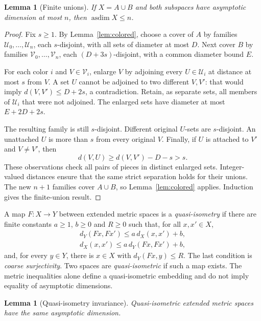 \documentclass[10pt,a4paper]{amsart}
\newtheorem{lemma}[theorem]{Lemma}
\DeclareMathOperator{\asdim}{asdim}
\newcommand{\cU}{\mathcal U}
\newcommand{\cV}{\mathcal V}
\begin{document}
\begin{lemma}[Finite unions]\label{lem:finite-union}
If $X=A\cup B$ and both subspaces have asymptotic dimension at most $n$,
then $\asdim X\le n$.
\end{lemma}

\begin{proof}
Fix $s\ge1$. By Lemma~\ref{lem:colored}, choose a cover of $A$ by families
$\cU_0,\ldots,\cU_n$, each $s$-disjoint, with all sets of diameter at most
$D$. Next cover $B$ by families $\cV_0,\ldots,\cV_n$, each
$(D+3s)$-disjoint, with a common diameter bound $E$.

For each color $i$ and $V\in\cV_i$, enlarge $V$ by adjoining every
$U\in\cU_i$ at distance at most $s$ from $V$. A set $U$ cannot be adjoined
to two different $V,V'$: that would imply
$d(V,V')\le D+2s$, a contradiction. Retain, as separate sets, all members
of $\cU_i$ that were not adjoined. The enlarged sets have diameter at most
$E+2D+2s$.

The resulting family is still $s$-disjoint. Different original $U$-sets
are $s$-disjoint. An unattached $U$ is more than $s$ from every original
$V$. Finally, if $U$ is attached to $V'$ and $V\ne V'$, then
\[
 d(V,U)\ge d(V,V')-D-s>s.
\]
These observations check all pairs of pieces in distinct enlarged sets.
Integer-valued distances ensure that the same strict separation holds
for their unions. The new $n+1$ families cover $A\cup B$, so
Lemma~\ref{lem:colored} applies. Induction gives the finite-union result.
\end{proof}

A map $F:X\to Y$ between extended metric spaces is a
\emph{quasi-isometry} if there are finite constants $a\ge1$, $b\ge0$
and $R\ge0$ such that, for all $x,x'\in X$,
\[
 \begin{aligned}
 d_Y(Fx,Fx')\le a\,d_X(x,x')+b,\\
 d_X(x,x')\le a\,d_Y(Fx,Fx')+b,
 \end{aligned}
\]
and, for every $y\in Y$, there is $x\in X$ with $d_Y(Fx,y)\le R$.
The last condition is \emph{coarse surjectivity}. Two spaces are
\emph{quasi-isometric} if such a map exists. The metric inequalities
alone define a quasi-isometric embedding and do not imply equality of
asymptotic dimensions.

\begin{lemma}[Quasi-isometry invariance]\label{lem:qi}
Quasi-isometric extended metric spaces have the same asymptotic dimension.
\end{lemma}
\end{document}
